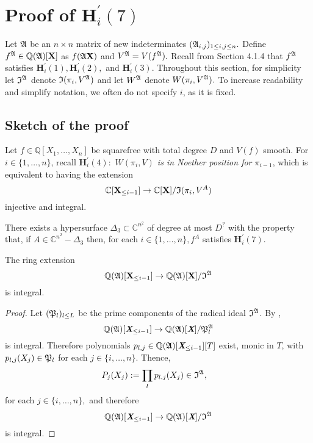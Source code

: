 \documentclass[sigconf]{acmart}
\def\Xb{\textit{\textbf{X}}}
\def\C{\mathbb{C}}
\def\I{\frak{I}}
\def\A{\frak{A}}
\def\fp{\frak{P}}
\begin{document}
\section{Proof of $\textbf{H}_i^{'}(7)$}
%
Let $\A$ be an $n \times n$ matrix of new indeterminates $(\A_{i,j})_{1 \leq i , j \leq n}.$ Define $f^{\A} \in \mathbb{Q}(\A)[\textbf{X}]$ as $f(\A\textbf{X})$ and $V^\A=V(f^\A).$ Recall from Section 4.1.4 that $f^\A$ satisfies $\textbf{H}_i^{'}(1),\textbf{H}_i^{'}(2),$ and $\textbf{H}_i^{'}(3).$ Throughout this section, for simplicity let $\I^\A$ denote $\I(\pi_i,V^\A)$ and let $W^\A$ denote $W(\pi_i,V^\A).$ To increase readability and simplify notation, we often do not specify $i$, as it is fixed.   
\subsection{Sketch of the proof}
Let $f \in \mathbb{Q}[X_1,\hdots,X_n]$ be squarefree with total degree $D$ and $V(f)$ smooth. For $i \in \{1,\hdots,n\}$, recall $\textbf{H}_i^{'}(4):$ \textit{$W(\pi_i,V)$ is in Noether position for $\pi_{i-1}$}, which is equivalent to having the extension  
\[
\C[\textbf{X}_{\leq i-1}]\rightarrow\C[\textbf{X}]/\frak{I}(\pi_i,V^A)
\]
injective and  integral.
%
%
%
\begin{theorem}
There exists a hypersurface $\Delta_3 \subset \C^{n^2}$ of degree at most $D^{?}$ with the property that, if $A \in \C^{n^2} - \Delta_3$ then, for each $i \in\{1,\hdots,n\}, f^A$ satisfies $\textbf{H}_i^{'}(7)$.
\end{theorem}
%
%
%
\begin{proposition} 
The ring extension \[\mathbb{Q}(\frak{A})[\textbf{X}_{\leq i-1}]\rightarrow\mathbb{Q}(\frak{A})[\textbf{X}]/\I^{\A}\] is integral.
\end{proposition}
%
\begin{proof}
Let $(\frak{P}_l)_{l \leq L}$ be the prime components of the radical ideal $\I^\A$. By \cite[Proposition 1]{EMP}, 
\[
\mathbb{Q}(\frak{A})[\textit{\textbf{X}}_{\leq i-1}]\rightarrow\mathbb{Q}(\frak{A})[\textit{\textbf{X}}]/\fp_l^{\A}
\] 
is integral. Therefore polynomials $p_{l,j}\in\mathbb{Q}(\frak{A})[\Xb_{\leq i-1}][T]$ exist, monic in $T$, with $p_{l,j}(X_j)\in \frak{P}_l$ for each $j\in \{i,\hdots,n\}.$ Thence, 
\begin{align*}
&P_{j}(X_j) := \prod_l p_{l,j}(X_j)\in\I^\A, 
\end{align*}
for each $j \in \{i,\hdots,n\},$ and therefore 
\[
\mathbb{Q}(\frak{A})[\textit{\textbf{X}}_{\leq i-1}]\rightarrow\mathbb{Q}(\frak{A})[\textit{\textbf{X}}]/\I^{\A}
\] 
is integral.
\end{proof}
\end{document}
